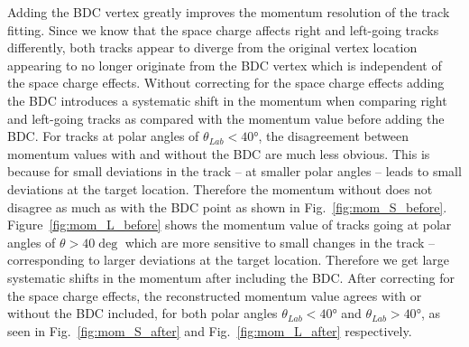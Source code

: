 Adding the BDC vertex greatly improves the momentum resolution of the track fitting.  Since we know that the space charge affects right and left-going tracks differently, both tracks appear to diverge from the original vertex location appearing to no longer originate from the BDC vertex which is independent of the space charge effects. Without correcting for the space charge effects adding the BDC introduces a systematic shift in the momentum when comparing right and left-going tracks as compared with the momentum value before adding the BDC. For tracks at polar angles of $\theta_{Lab} < \ang{40}$, the disagreement between momentum values with and without the BDC are much less obvious. This is because for small deviations in the track -- at smaller polar angles -- leads to small deviations at the target location. Therefore the momentum without does not disagree as much as with the BDC point as shown in Fig.~\ref{fig:mom_S_before}. Figure~\ref{fig:mom_L_before} shows the momentum value of tracks going at polar angles of $\theta > 40 \deg$ which are more sensitive to small changes in the track -- corresponding to larger deviations at the target location. Therefore we get large systematic shifts in the momentum after including the BDC. After correcting for the space charge effects, the reconstructed momentum value agrees with or without the BDC included, for both  polar angles $\theta_{Lab} < \ang{40}$ and $\theta_{Lab} > \ang{40}$, as seen in Fig.~\ref{fig:mom_S_after} and Fig.~\ref{fig:mom_L_after} respectively. 


